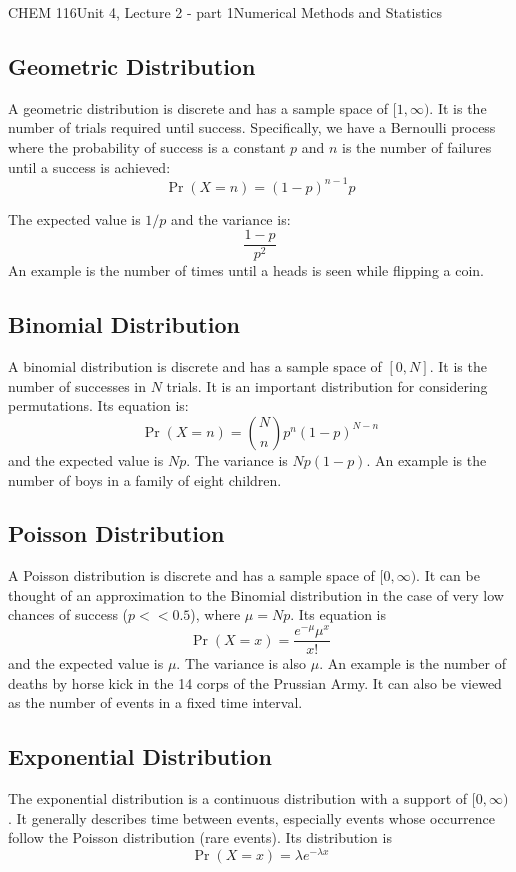\documentclass{article}
\begin{document}
\begin{tdoc}{CHEM 116}{Unit 4, Lecture 2 - part 1}{Numerical Methods and Statistics}
\subsection{Geometric Distribution}
A geometric distribution is discrete and has a sample space of
$[1,\infty)$. It is the number of trials required until
  success. Specifically, we have a Bernoulli process where the
  probability of success is a constant $p$ and $n$ is the number of
  failures until a success is achieved:
\begin{equation}
\Pr(X = n) = (1 - p)^{n - 1}p
\end{equation}

The expected value is $1 / p$ and the variance is: 
\begin{equation}
\frac{1 - p}{p^2}
\end{equation}
An example is the number of times until a heads is seen while flipping
a coin.

\subsection{Binomial Distribution}
A binomial distribution is discrete and has a sample space of
$[0,N]$. It is the number of successes in $N$ trials. It is an
important distribution for considering permutations. Its equation is:
\begin{equation}
\Pr(X=n) =  {N \choose n} p^n(1 - p)^{N - n}
\end{equation}
and the expected value is $Np$. The variance is $Np(1-p)$. An example
is the number of boys in a family of eight children.

\subsection{Poisson Distribution}
A Poisson distribution is discrete and has a sample space of
$[0,\infty)$. It can be thought of an approximation to the Binomial
  distribution in the case of very low chances of success ($p << 0.5$), 
  where $\mu = Np$. Its equation is
\begin{equation}
\Pr(X = x) = \frac{e^{-\mu}{\mu^x}}{x!}
\end{equation}
and the expected value is $\mu$. The variance is also $\mu$. An
example is the number of deaths by horse kick in the 14 corps of the
Prussian Army. It can also be viewed as the number of events in a
fixed time interval.

\subsection{Exponential Distribution}
The exponential distribution is a continuous distribution with a
support of $[0,\infty)$. It generally describes time between events,
  especially events whose occurrence follow the Poisson distribution
  (rare events). Its distribution is
\begin{equation}
\Pr(X = x) = \lambda e^{-\lambda x}
\end{equation}


\end{tdoc}
\end{document}
